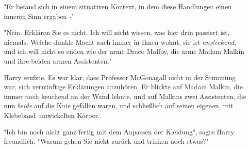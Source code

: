 "Er befand sich in einem situativen Kontext, in dem diese Handlungen einen inneren Sinn ergaben -" 

"Nein. Erklären Sie es nicht. Ich will nicht wissen, was hier drin passiert ist, niemals. Welche dunkle Macht auch immer in Ihnen wohnt, sie ist \emph{ansteckend}, und ich will nicht so enden wie der arme Draco Malfoy, die arme Madam Malkin und ihre beiden armen Assistenten." 

Harry seufzte. Es war klar, dass Professor McGonagall nicht in der Stimmung war, sich vernünftige Erklärungen anzuhören. Er blickte auf Madam Malkin, die immer noch keuchend an der Wand lehnte, und auf Malkins zwei Assistenten, die nun \emph{beide} auf die Knie gefallen waren, und schließlich auf seinen eigenen, mit Klebeband umwickelten Körper.

"Ich bin noch nicht ganz fertig mit dem Anpassen der Kleidung", sagte Harry freundlich. "Warum gehen Sie nicht zurück und trinken noch etwas?" 

